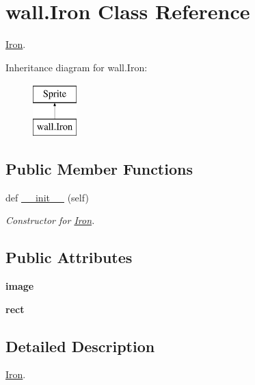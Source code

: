 \hypertarget{classwall_1_1_iron}{}\section{wall.\+Iron Class Reference}
\label{classwall_1_1_iron}


\mbox{\hyperlink{classwall_1_1_iron}{Iron}}.  


Inheritance diagram for wall.\+Iron\+:\begin{figure}[H]
\begin{center}
\leavevmode
\includegraphics[height=2.000000cm]{classwall_1_1_iron}
\end{center}
\end{figure}
\subsection*{Public Member Functions}
\begin{DoxyCompactItemize}
\item 
def \mbox{\hyperlink{classwall_1_1_iron_a2adf26bdf967f38cf9793cf290f61615}{\+\_\+\+\_\+init\+\_\+\+\_\+}} (self)
\begin{DoxyCompactList}\small\item\em Constructor for \mbox{\hyperlink{classwall_1_1_iron}{Iron}}. \end{DoxyCompactList}\end{DoxyCompactItemize}
\subsection*{Public Attributes}
\begin{DoxyCompactItemize}
\item 
\mbox{\label{classwall_1_1_iron_ab62d9f58563962ee86a031689ba1230b}} 
{\bfseries image}
\item 
\mbox{\label{classwall_1_1_iron_aee584335cda3443b8fca8a77dad84f86}} 
{\bfseries rect}
\end{DoxyCompactItemize}


\subsection{Detailed Description}
\mbox{\hyperlink{classwall_1_1_iron}{Iron}}. 

